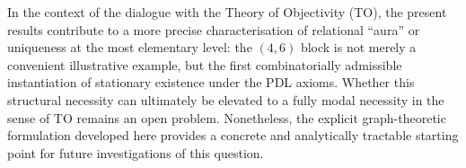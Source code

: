 \documentclass[11pt,a4paper]{article}
\theoremstyle{definition}
\begin{document}
In the context of the dialogue with the Theory of Objectivity (TO), the present results contribute to a more precise characterisation of relational ``aura'' or uniqueness at the most elementary level: the $(4,6)$ block is not merely a convenient illustrative example, but the first combinatorially admissible instantiation of stationary existence under the PDL axioms.\cite{PDL_TO_Dialogue_2026,PDL_Global_Mapping_2026} Whether this structural necessity can ultimately be elevated to a fully modal necessity in the sense of TO remains an open problem. Nonetheless, the explicit graph-theoretic formulation developed here provides a concrete and analytically tractable starting point for future investigations of this question.



\end{document}
